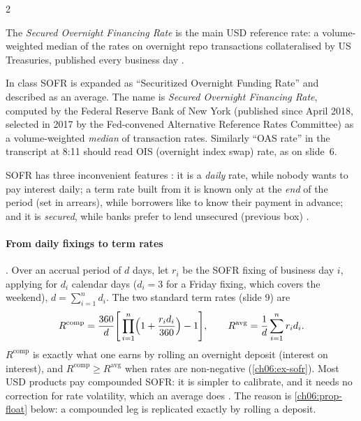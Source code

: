 \begin{paracol}{2}
\begin{definition}[SOFR]
The \emph{Secured Overnight Financing Rate} is the main USD reference rate: a volume-weighted median of the
rates on overnight repo transactions collateralised by US Treasuries, published every business day
.
\end{definition}

\begin{coursenote}
In class SOFR is expanded as ``Securitized Overnight Funding Rate'' and described as an average. The name is
\emph{Secured Overnight Financing Rate}, computed by the Federal Reserve Bank of New York (published since April
2018, selected in 2017 by the Fed-convened Alternative Reference Rates Committee) as a volume-weighted
\emph{median} of transaction rates. Similarly ``OAS rate'' in the transcript at 8:11 should read OIS
(overnight index swap) rate, as on slide~6.
\end{coursenote}

SOFR has three inconvenient features : it is a \emph{daily} rate, while nobody wants to pay
interest daily; a term rate built from it is known only at the \emph{end} of the period (set in arrears), while
borrowers like to know their payment in advance; and it is \emph{secured}, while banks prefer to lend
unsecured (previous box) .

\paragraph{From daily fixings to term rates} . Over an accrual period of $d$ days, let $r_i$
be the SOFR fixing of business day $i$, applying for $d_i$ calendar days ($d_i=3$ for a Friday fixing, which
covers the weekend), $d=\sum_{i=1}^nd_i$. The two standard term rates (slide 9) are
\begin{equation}\label{ch06:eq-sofr}
  R^{\mathrm{comp}} = \frac{360}{d}\Biggl[\,\prod_{i=1}^{n}\Bigl(1+\frac{r_i d_i}{360}\Bigr)-1\Biggr],
  \qquad
  R^{\mathrm{avg}} = \frac1d\sum_{i=1}^{n} r_i d_i .
\end{equation}
$R^{\mathrm{comp}}$ is exactly what one earns by rolling an overnight deposit (interest on interest), and
$R^{\mathrm{comp}}\ge R^{\mathrm{avg}}$ when rates are non-negative (\cref{ch06:ex-sofr}). Most USD products pay
compounded SOFR: it is simpler to calibrate, and it needs no correction for rate volatility, which an average
does . The reason is \cref{ch06:prop-float} below: a compounded leg is replicated exactly by
rolling a deposit.


\end{paracol}
